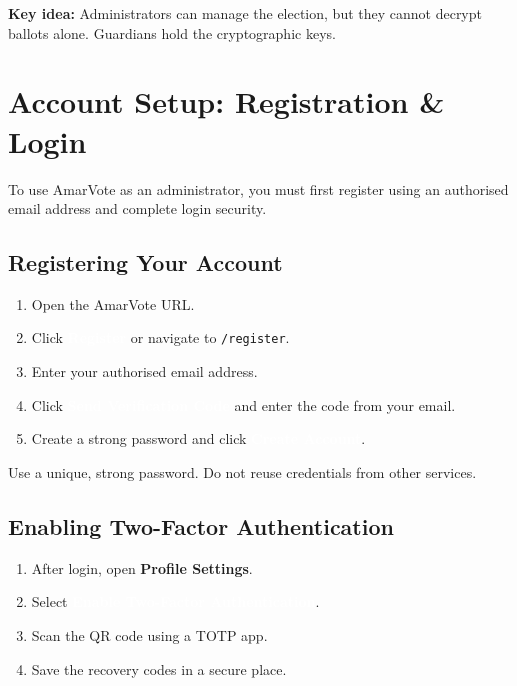 \documentclass[12pt,a4paper]{book}
\newcommand{\uibutton}[1]{\colorbox{adminred}{\textcolor{white}{\small\textbf{#1}}}}
\newcommand{\uimenu}[1]{\textbf{\color{adminred}#1}}
\begin{document}
\begin{tcolorbox}[notebox]
\textbf{Key idea:} Administrators can manage the election, but they cannot decrypt ballots alone. Guardians hold the cryptographic keys.
\end{tcolorbox}

\mainmatter

\chapter{Account Setup: Registration \& Login}

To use AmarVote as an administrator, you must first register using an authorised email address and complete login security.

\section{Registering Your Account}

\begin{enumerate}
  \item Open the AmarVote URL.
  \item Click \uibutton{Register} or navigate to \texttt{/register}.
  \item Enter your authorised email address.
  \item Click \uibutton{Send Verification Code} and enter the code from your email.
  \item Create a strong password and click \uibutton{Create Account}.
\end{enumerate}

\begin{tcolorbox}[dangerbox]
Use a unique, strong password. Do not reuse credentials from other services.
\end{tcolorbox}

\section{Enabling Two-Factor Authentication}

\begin{enumerate}
  \item After login, open \uimenu{Profile Settings}.
  \item Select \uibutton{Enable Two-Factor Authentication}.
  \item Scan the QR code using a TOTP app.
  \item Save the recovery codes in a secure place.
\end{enumerate}
\end{document}
